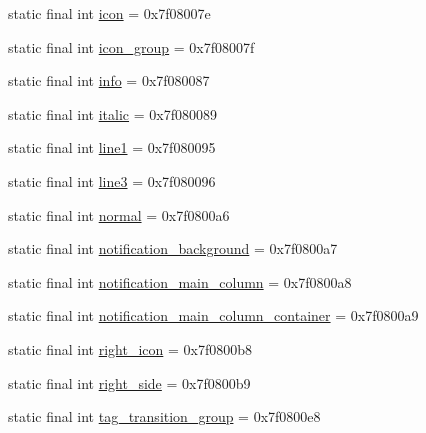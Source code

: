 \begin{DoxyCompactItemize}
static final int \mbox{\hyperlink{classandroid_1_1support_1_1graphics_1_1drawable_1_1_r_1_1id_ae0a7affdbd0448660c604b248aeae54e}{icon}} = 0x7f08007e
\item 
static final int \mbox{\hyperlink{classandroid_1_1support_1_1graphics_1_1drawable_1_1_r_1_1id_abd07d96a991ba4fb2e5b58fa7200390e}{icon\+\_\+group}} = 0x7f08007f
\item 
static final int \mbox{\hyperlink{classandroid_1_1support_1_1graphics_1_1drawable_1_1_r_1_1id_ab008f7982ba0395901c5402d04046006}{info}} = 0x7f080087
\item 
static final int \mbox{\hyperlink{classandroid_1_1support_1_1graphics_1_1drawable_1_1_r_1_1id_ab3f1b9d2d2677cbbc18db586d7599aa7}{italic}} = 0x7f080089
\item 
static final int \mbox{\hyperlink{classandroid_1_1support_1_1graphics_1_1drawable_1_1_r_1_1id_a85dc5f1d60bf411fcbb75962f798eceb}{line1}} = 0x7f080095
\item 
static final int \mbox{\hyperlink{classandroid_1_1support_1_1graphics_1_1drawable_1_1_r_1_1id_a3e475586ebabb2808945680e4629b8bc}{line3}} = 0x7f080096
\item 
static final int \mbox{\hyperlink{classandroid_1_1support_1_1graphics_1_1drawable_1_1_r_1_1id_a89ccce30f996f9eb78ef5db9f3a17071}{normal}} = 0x7f0800a6
\item 
static final int \mbox{\hyperlink{classandroid_1_1support_1_1graphics_1_1drawable_1_1_r_1_1id_a27f2265bcdbeb02d1a337c7e4a3052d7}{notification\+\_\+background}} = 0x7f0800a7
\item 
static final int \mbox{\hyperlink{classandroid_1_1support_1_1graphics_1_1drawable_1_1_r_1_1id_aabf00f5888a3194f048b6f29f102f04f}{notification\+\_\+main\+\_\+column}} = 0x7f0800a8
\item 
static final int \mbox{\hyperlink{classandroid_1_1support_1_1graphics_1_1drawable_1_1_r_1_1id_aa32710627d3a79e215b72284bb4fea0c}{notification\+\_\+main\+\_\+column\+\_\+container}} = 0x7f0800a9
\item 
static final int \mbox{\hyperlink{classandroid_1_1support_1_1graphics_1_1drawable_1_1_r_1_1id_aad264117d09758f8112d92656aada0a1}{right\+\_\+icon}} = 0x7f0800b8
\item 
static final int \mbox{\hyperlink{classandroid_1_1support_1_1graphics_1_1drawable_1_1_r_1_1id_a5e84b5089abd6844223c1ef63cd3c51f}{right\+\_\+side}} = 0x7f0800b9
\item 
static final int \mbox{\hyperlink{classandroid_1_1support_1_1graphics_1_1drawable_1_1_r_1_1id_abb7a6bbdadfbd2d8103c347898624888}{tag\+\_\+transition\+\_\+group}} = 0x7f0800e8

\end{DoxyCompactItemize}
